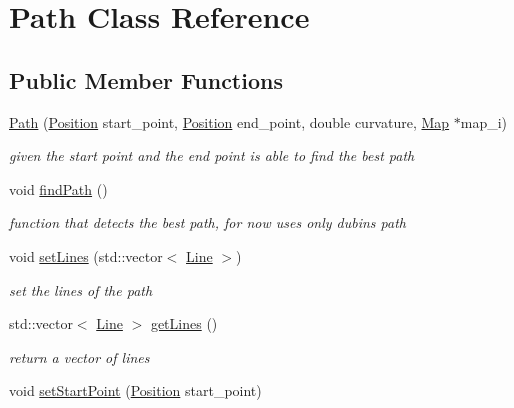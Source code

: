 \hypertarget{class_path}{}\section{Path Class Reference}
\label{class_path}
\subsection*{Public Member Functions}
\begin{DoxyCompactItemize}
\item 
\mbox{\hyperlink{class_path_a6abfa12b45ae127daa7408571b62b74d}{Path}} (\mbox{\hyperlink{class_position}{Position}} start\+\_\+point, \mbox{\hyperlink{class_position}{Position}} end\+\_\+point, double curvature, \mbox{\hyperlink{class_map}{Map}} $\ast$map\+\_\+i)
\begin{DoxyCompactList}\small\item\em given the start point and the end point is able to find the best path \end{DoxyCompactList}\item 
\mbox{\label{class_path_ab45faf702862c6594068a3ed2d026cda}} 
void \mbox{\hyperlink{class_path_ab45faf702862c6594068a3ed2d026cda}{find\+Path}} ()
\begin{DoxyCompactList}\small\item\em function that detects the best path, for now uses only dubins path \end{DoxyCompactList}\item 
\mbox{\label{class_path_ae5b5816b3480e9f103079bb3467dc65f}} 
void \mbox{\hyperlink{class_path_ae5b5816b3480e9f103079bb3467dc65f}{set\+Lines}} (std\+::vector$<$ \mbox{\hyperlink{class_line}{Line}} $>$)
\begin{DoxyCompactList}\small\item\em set the lines of the path \end{DoxyCompactList}\item 
std\+::vector$<$ \mbox{\hyperlink{class_line}{Line}} $>$ \mbox{\hyperlink{class_path_aff0072e2e1cf183ba6fc240cd85045e2}{get\+Lines}} ()
\begin{DoxyCompactList}\small\item\em return a vector of lines \end{DoxyCompactList}\item 
void \mbox{\hyperlink{class_path_a87f4082a3c5af3aa37260cb99c605156}{set\+Start\+Point}} (\mbox{\hyperlink{class_position}{Position}} start\+\_\+point)

\end{DoxyCompactItemize}
